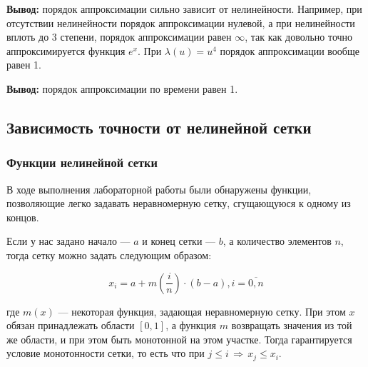 \begin{center}
\noindent{}
\end{center}

\textbf{Вывод:} порядок аппроксимации сильно зависит от нелинейности. Например, при отсутствии нелинейности порядок аппроксимации нулевой, а при нелинейности вплоть до 3 степени, порядок аппроксимации равен $\infty$, так как довольно точно аппроксимируется функция $e^x$. При $\lambda(u) = u^4$ порядок аппроксимации вообще равен 1.

\textbf{Вывод:} порядок аппроксимации по времени равен 1.

\subsection{Зависимость точности от нелинейной сетки}

\subsubsection{Функции нелинейной сетки}

В ходе выполнения лабораторной работы были обнаружены функции, позволяющие легко задавать неравномерную сетку, сгущающуюся к одному из концов.

Если у нас задано начало --- $a$ и конец сетки --- $b$, а количество элементов $n$, тогда сетку можно задать следующим образом:

$$ x_i = a + m\left(\frac{i}{n}\right) \cdot (b-a), i=\overline{0, n} $$

где $m(x)$ --- некоторая функция, задающая неравномерную сетку. При этом $x$ обязан принадлежать области $[0, 1]$, а функция $m$ возвращать значения из той же области, и при этом быть монотонной на этом участке. Тогда гарантируется условие монотонности сетки, то есть что при $j \leqslant i\, \Rightarrow\, x_j \leqslant x_i$. 


